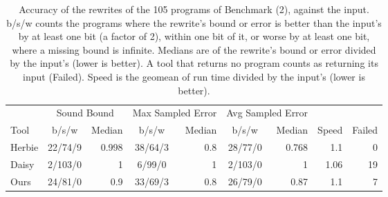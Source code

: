 \begin{table}[H] \centering \small
\caption{Accuracy of the rewrites of the 105 programs of Benchmark (2), against the input. b/s/w counts the programs where the rewrite's bound or error is better than the input's by at least one bit (a factor of 2), within one bit of it, or worse by at least one bit, where a missing bound is infinite. Medians are of the rewrite's bound or error divided by the input's (lower is better). A tool that returns no program counts as returning its input (Failed). Speed is the geomean of run time divided by the input's (lower is better).}\label{tab:accuracy}
\begin{tabular}{lcrcrcrrr}
\toprule
& \multicolumn{2}{c}{Sound Bound} & \multicolumn{2}{c}{Max Sampled Error} & \multicolumn{2}{c}{Avg Sampled Error} & & \\
\cmidrule(lr){2-3}\cmidrule(lr){4-5}\cmidrule(lr){6-7}
Tool & b/s/w & Median & b/s/w & Median & b/s/w & Median & Speed & Failed \\
\midrule
Herbie & 22/74/9 & 0.998 & 38/64/3 & 0.8 & 28/77/0 & 0.768 & 1.1 & 0 \\
Daisy & 2/103/0 & 1 & 6/99/0 & 1 & 2/103/0 & 1 & 1.06 & 19 \\
Ours & 24/81/0 & 0.9 & 33/69/3 & 0.8 & 26/79/0 & 0.87 & 1.1 & 7 \\
\bottomrule
\end{tabular}
\end{table}
